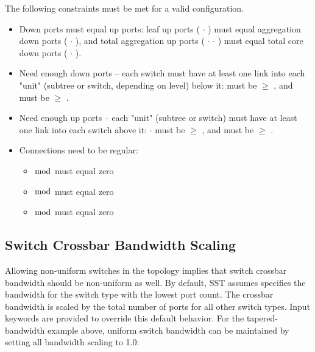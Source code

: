 The following constraints must be met for a valid configuration.
\begin{itemize}
\renewcommand{\labelitemii}{$\circ$}
\item Down ports must equal up ports: leaf up ports ( $\cdot$ ) must equal aggregation down ports ( $\cdot$ ), and total aggregation up ports ( $\cdot$  $\cdot$ ) must equal total core down ports ( $\cdot$ ).
\item Need enough down ports -- each switch must have at least one link into each "unit" (subtree or switch, depending on level) below it:   must be $\geq$ , and  must be $\geq$ .
\item Need enough up ports -- each "unit" (subtree or switch) must have at least one link into each switch above it:  $\cdot$  must be $\geq$ , and  must be $\geq$ .
\item Connections need to be regular:
  \begin{itemize}
  \item {} $\bmod$  must equal zero
  \item {} $\bmod$  must equal zero
  \item {} $\bmod$  must equal zero
  \end{itemize}
\end{itemize}

\subsection{Switch Crossbar Bandwidth Scaling}
\label{subsec:fattree:xbarbw}

Allowing non-uniform switches in the topology implies that switch crossbar bandwidth should be non-uniform as well.
By default, SST assumes  specifies the bandwidth for the switch type with the lowest port count.
The crossbar bandwidth is scaled by the total number of ports for all other switch types. 
Input keywords are provided to override this default behavior.
For the tapered-bandwidth example above, uniform switch bandwidth can be maintained by setting all bandwidth scaling to 1.0:

